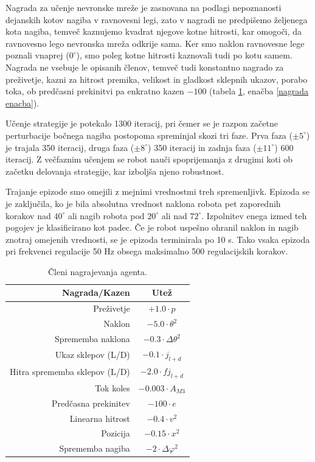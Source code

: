 Nagrada za učenje nevronske mreže je zasnovana na podlagi nepoznanosti dejanskih kotov nagiba v ravnovesni legi, zato v nagradi ne predpišemo željenega kota nagiba, temveč kaznujemo kvadrat njegove kotne hitrosti, kar omogoči, da ravnovesno lego nevronska mreža odkrije sama. Ker smo naklon ravnovesne lege poznali vnaprej ($ 0^\circ $), smo poleg kotne hitrosti kaznovali tudi po kotu samem. Nagrada ne vsebuje le opisanih členov, temveč tudi konstantno nagrado za preživetje, kazni za hitrost premika, velikost in gladkost sklepnih ukazov, porabo toka, ob predčasni prekinitvi pa enkratno kazen $-100$ (tabela \ref{tabela}, enačba \ref{nagrada enacba}). 
 
  Učenje strategije je potekalo 1300 iteracij, pri čemer se je razpon začetne perturbacije bočnega nagiba postopoma spreminjal skozi tri faze. Prva faza ($ \pm 5^\circ $) je trajala 350 iteracij, druga faza ($ \pm 8^\circ $) 350 iteracij in zadnja faza ($ \pm 11^\circ $) 600 iteracij. Z večfaznim učenjem se robot nauči spoprijemanja z drugimi koti ob začetku delovanja strategije, kar izboljša njeno robustnost.

  Trajanje epizode smo omejili z mejnimi vrednostmi treh spremenljivk. Epizoda se je zaključila, ko je bila absolutna vrednost naklona robota pet zaporednih korakov nad $ 40^\circ $ ali nagib robota pod $ 20^\circ $ ali nad $ 72^\circ $. Izpolnitev enega izmed teh pogojev je klasificirano kot padec. Če je robot uspešno ohranil naklon in nagib znotraj omejenih vrednosti, se je epizoda terminirala po 10 s. Tako vsaka epizoda pri frekvenci regulacije 50 Hz obsega maksimalno 500 regulacijskih korakov.

\begin{table}[h]
\caption{Členi nagrajevanja agenta.} \label{tabela}
\smallskip
\begin{center}
  \begin{tabular}{ | r | c | }
  \hline  
  \textbf{Nagrada/Kazen} & \textbf{Utež} \\ 
  \hline  
  Preživetje & $ +1.0 \cdot p $ \\
  Naklon & $ -5.0 \cdot \theta ^ 2 $ \\
  Sprememba naklona & $ -0.3 \cdot \Delta\theta ^ 2 $ \\
  Ukaz sklepov (L/D) & $-0.1 \cdot j_{l+d}$ \\
  Hitra sprememba sklepov (L/D) & $-2.0 \cdot fj_{l+d}$ \\
  Tok koles & $-0.003 \cdot A_{M3} $ \\
  Predčasna prekinitev & $-100 \cdot e$ \\
  Linearna hitrost & $ -0.4 \cdot v ^2 $ \\
  Pozicija & $ -0.15 \cdot x ^ 2 $ \\  
  Sprememba nagiba & $ -2 \cdot \Delta\varphi ^ 2 $ \\
  \hline  
  \end{tabular}
\end{center}
\end{table}


